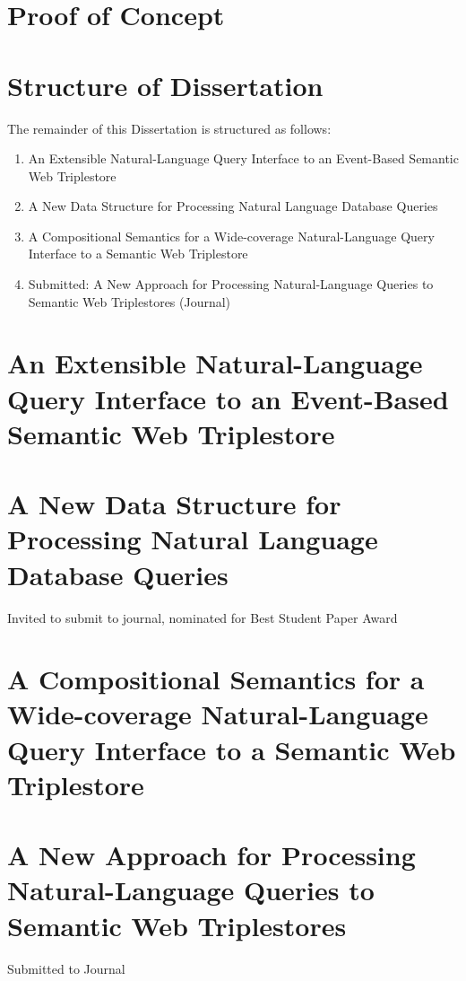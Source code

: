 \documentclass[../main.tex]{subfiles}
\begin{document}
\section{Proof of Concept} 

\section{Structure of Dissertation}

The remainder of this Dissertation is structured as follows:

\begin{enumerate}
	\item An Extensible Natural-Language Query Interface to an Event-Based Semantic Web Triplestore
	\item A New Data Structure for Processing Natural Language Database Queries 
	\item A Compositional Semantics for a Wide-coverage Natural-Language Query Interface to a Semantic Web Triplestore
	\item Submitted: A New Approach for Processing Natural-Language Queries to Semantic Web Triplestores (Journal)
\end{enumerate}

\section{An Extensible Natural-Language Query Interface to an Event-Based Semantic Web Triplestore}

\section{A New Data Structure for Processing Natural Language Database Queries}

Invited to submit to journal, nominated for Best Student Paper Award

\section{A Compositional Semantics for a Wide-coverage Natural-Language Query Interface to a Semantic Web Triplestore}

\section{A New Approach for Processing Natural-Language Queries to Semantic Web Triplestores}

Submitted to Journal
\end{document}
